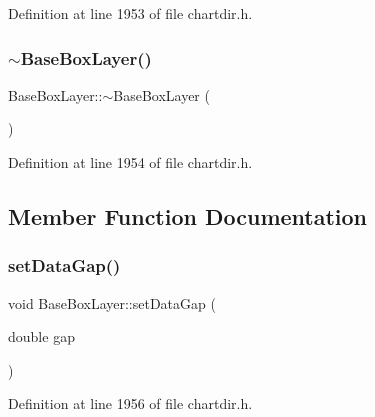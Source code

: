 Definition at line 1953 of file chartdir.\+h.

\mbox{\label{class_base_box_layer_aef86dbd6f32fdda32786c0cbdc64101e}} 
\subsubsection{\texorpdfstring{$\sim$\+Base\+Box\+Layer()}{~BaseBoxLayer()}}
{\footnotesize\ttfamily Base\+Box\+Layer\+::$\sim$\+Base\+Box\+Layer (\begin{DoxyParamCaption}{ }\end{DoxyParamCaption})\hspace{0.3cm}{\ttfamily [inline]}}



Definition at line 1954 of file chartdir.\+h.



\subsection{Member Function Documentation}
\mbox{\label{class_base_box_layer_a1d7193833d5c13dda5fa30ca431c72f5}} 
\subsubsection{\texorpdfstring{set\+Data\+Gap()}{setDataGap()}}
{\footnotesize\ttfamily void Base\+Box\+Layer\+::set\+Data\+Gap (\begin{DoxyParamCaption}\item[{double}]{gap }\end{DoxyParamCaption})\hspace{0.3cm}{\ttfamily [inline]}}



Definition at line 1956 of file chartdir.\+h.

